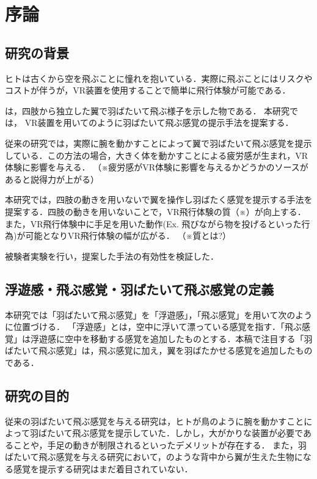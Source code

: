 \chapter[序論]%
        {序論}
\section{研究の背景}


        ヒトは古くから空を飛ぶことに憧れを抱いている．実際に飛ぶことにはリスクやコストが伴うが，VR装置を使用することで簡単に飛行体験が可能である．

        は，四肢から独立した翼で羽ばたいて飛ぶ様子を示した物である．
        本研究では，
        VR装置を用いてのように羽ばたいて飛ぶ感覚の提示手法を提案する．

        従来の研究では，実際に腕を動かすことによって翼で羽ばたいて飛ぶ感覚を提示している．この方法の場合，大きく体を動かすことによる疲労感が生まれ，VR体験に影響を与える．
        （※疲労感がVR体験に影響を与えるかどうかのソースがあると説得力が上がる）

        本研究では，四肢の動きを用いないで翼を操作し羽ばたく感覚を提示する手法を提案する．四肢の動きを用いないことで，VR飛行体験の質（※）が向上する．また，VR飛行体験中に手足を用いた動作(Ex. 飛びながら物を投げるといった行為)が可能となりVR飛行体験の幅が広がる．
        （※質とは?）

        被験者実験を行い，提案した手法の有効性を検証した．

\section{浮遊感・飛ぶ感覚・羽ばたいて飛ぶ感覚の定義}
        本研究では「羽ばたいて飛ぶ感覚」を「浮遊感」，「飛ぶ感覚」を用いて次のように位置づける．
        「浮遊感」とは，空中に浮いて漂っている感覚を指す．「飛ぶ感覚」は浮遊感に空中を移動する感覚を追加したものとする．本稿で注目する「羽ばたいて飛ぶ感覚」は，飛ぶ感覚に加え，翼を羽ばたかせる感覚を追加したものである．

\section{研究の目的}
        従来の羽ばたいて飛ぶ感覚を与える研究は，ヒトが鳥のように腕を動かすことによって羽ばたいて飛ぶ感覚を提示していた．しかし，大がかりな装置が必要であることや，手足の動きが制限されるといったデメリットが存在する．
        また，羽ばたいて飛ぶ感覚を与える研究において，のような背中から翼が生えた生物になる感覚を提示する研究はまだ着目されていない．

